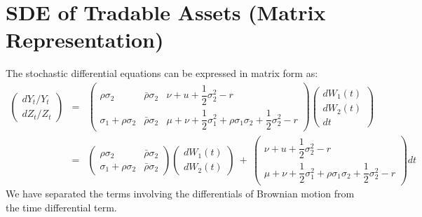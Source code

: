 \documentclass[uplatex,a4j,12pt,dvipdfmx]{jsarticle}
\begin{document}
\section{SDE of Tradable Assets (Matrix Representation)}
The stochastic differential equations can be expressed in matrix form as:
%
%
\begin{eqnarray}
	\left(
	\begin{array}{c}
		d Y_{t} / Y_{t}
		\\[2mm]
		d Z_{t} / Z_{t}
	\end{array}
	\right)
	&=&
	\left(
	\begin{array}{ccc}
		\rho \sigma_{2}              & \bar{\rho} \sigma_{2} & \nu + u + \dfrac{1}{2} \sigma_{2}^{2} - r
		\\
		\sigma_{1} + \rho \sigma_{2} & \bar{\rho} \sigma_{2} & \mu + \nu + \dfrac{1}{2} \sigma_{1}^{2} + \rho \sigma_{1} \sigma_{2} + \dfrac{1}{2} \sigma_{2}^{2} - r
	\end{array}
	\right)
	\left(
	\begin{array}{c}
		dW_{1}(t)
		\\
		dW_{2}(t)
		\\
		dt
	\end{array}
	\right)
	\\ &=&
	\left(
	\begin{array}{cc}
		\rho \sigma_{2}              & \bar{\rho} \sigma_{2}
		\\
		\sigma_{1} + \rho \sigma_{2} & \bar{\rho} \sigma_{2}
	\end{array}
	\right)
	\left(
	\begin{array}{c}
		dW_{1}(t)
		\\
		dW_{2}(t)
	\end{array}
	\right)
	\ + \
	\left(
	\begin{array}{c}
		\nu + u + \dfrac{1}{2} \sigma_{2}^{2} - r
		\\
		\mu + \nu + \dfrac{1}{2} \sigma_{1}^{2} + \rho \sigma_{1} \sigma_{2} + \dfrac{1}{2} \sigma_{2}^{2} - r
	\end{array}
	\right)
	dt
\end{eqnarray}
%
%
We have separated the terms involving the differentials of Brownian motion from the time differential term.
\end{document}
